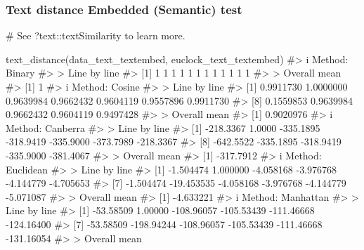 \documentclass[
  12pt,
  a4paper,
  oneside]{tesesusp}
\newenvironment{Shaded}{\begin{snugshade}}{\end{snugshade}}
\newcommand{\CommentTok}[1]{\textcolor[rgb]{0.37,0.37,0.37}{#1}}
\newcommand{\FunctionTok}[1]{\textcolor[rgb]{0.28,0.35,0.67}{#1}}
\newcommand{\NormalTok}[1]{\textcolor[rgb]{0.00,0.23,0.31}{#1}}
\begin{document}
\hypertarget{text-distance-embedded-semantic-test}{%
\subsubsection{Text distance \textbar{} Embedded (Semantic)
test}\label{text-distance-embedded-semantic-test}}

\begin{Shaded}
\begin{Highlighting}[numbers=left,,]
\CommentTok{\# See \textasciigrave{}?text::textSimilarity\textasciigrave{} to learn more.}

\FunctionTok{text\_distance}\NormalTok{(data\_text\_textembed, euclock\_text\_textembed)}
\CommentTok{\#\textgreater{} i Method: Binary}
\CommentTok{\#\textgreater{} \textgreater{} Line by line}
\CommentTok{\#\textgreater{}  [1] 1 1 1 1 1 1 1 1 1 1 1 1}
\CommentTok{\#\textgreater{} \textgreater{} Overall mean}
\CommentTok{\#\textgreater{} [1] 1}
\CommentTok{\#\textgreater{} i Method: Cosine}
\CommentTok{\#\textgreater{} \textgreater{} Line by line}
\CommentTok{\#\textgreater{}  [1] 0.9911730 1.0000000 0.9639984 0.9662432 0.9604119 0.9557896 0.9911730}
\CommentTok{\#\textgreater{}  [8] 0.1559853 0.9639984 0.9662432 0.9604119 0.9497428}
\CommentTok{\#\textgreater{} \textgreater{} Overall mean}
\CommentTok{\#\textgreater{} [1] 0.9020976}
\CommentTok{\#\textgreater{} i Method: Canberra}
\CommentTok{\#\textgreater{} \textgreater{} Line by line}
\CommentTok{\#\textgreater{}  [1] {-}218.3367    1.0000 {-}335.1895 {-}318.9419 {-}335.9000 {-}373.7989 {-}218.3367}
\CommentTok{\#\textgreater{}  [8] {-}642.5522 {-}335.1895 {-}318.9419 {-}335.9000 {-}381.4067}
\CommentTok{\#\textgreater{} \textgreater{} Overall mean}
\CommentTok{\#\textgreater{} [1] {-}317.7912}
\CommentTok{\#\textgreater{} i Method: Euclidean}
\CommentTok{\#\textgreater{} \textgreater{} Line by line}
\CommentTok{\#\textgreater{}  [1]  {-}1.504474   1.000000  {-}4.058168  {-}3.976768  {-}4.144779  {-}4.705653}
\CommentTok{\#\textgreater{}  [7]  {-}1.504474 {-}19.453535  {-}4.058168  {-}3.976768  {-}4.144779  {-}5.071087}
\CommentTok{\#\textgreater{} \textgreater{} Overall mean}
\CommentTok{\#\textgreater{} [1] {-}4.633221}
\CommentTok{\#\textgreater{} i Method: Manhattan}
\CommentTok{\#\textgreater{} \textgreater{} Line by line}
\CommentTok{\#\textgreater{}  [1]  {-}53.58509    1.00000 {-}108.96057 {-}105.53439 {-}111.46668 {-}124.16400}
\CommentTok{\#\textgreater{}  [7]  {-}53.58509 {-}198.94244 {-}108.96057 {-}105.53439 {-}111.46668 {-}131.16054}
\CommentTok{\#\textgreater{} \textgreater{} Overall mean}

\end{Highlighting}
\end{Shaded}
\end{document}
